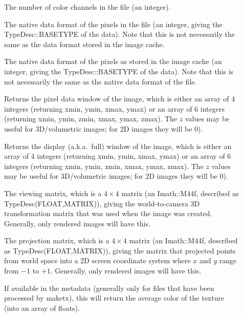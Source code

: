 \begin{description}
\item[\rm {}] The number of color channels in the file 
(an integer).

\item[\rm {}] The native data format of the pixels in the
  file (an integer, giving the {\cf TypeDesc::BASETYPE} of the data).
  Note that this is not necessarily the same as the data format stored
  in the image cache.

\item[\rm {}] The native data format of the pixels as
  stored in the image cache (an integer, giving the {\cf
    TypeDesc::BASETYPE} of the data).  Note that this is not necessarily
  the same as the native data format of the file.

\item[\rm {}] 
Returns the pixel data window of the image, which is either an array of 4
integers (returning xmin, ymin, xmax, ymax) or an array of 6 integers
(returning xmin, ymin, zmin, xmax, ymax, zmax). The $z$ values may be useful
for 3D/volumetric images; for 2D images they will be 0).

\item[\rm {}] 
Returns the display (a.k.a.\ full) window of the image, which is either an
array of 4 integers (returning xmin, ymin, xmax, ymax) or an array of 6
integers (returning xmin, ymin, zmin, xmax, ymax, zmax). The $z$ values may
be useful for 3D/volumetric images; for 2D images they will be 0).

\item[\rm {}] The viewing matrix, which is a $4 \times 4$
matrix (an {\cf Imath::M44f}, described as {\cf TypeDesc(FLOAT,MATRIX)}),
giving the world-to-camera 3D transformation matrix that was used when  the
image was created. Generally, only rendered images will have this.

\item[\rm {}] The projection matrix, which is a $4 \times 4$
matrix (an {\cf Imath::M44f}, described as {\cf TypeDesc(FLOAT,MATRIX)}),
giving the matrix that projected points from world space into a 2D screen
coordinate system where $x$ and $y$ range from $-1$ to $+1$.  Generally,
only rendered images will have this.

\item[\rm {}] If available in the metadata (generally only
for files that have been processed by {\cf maketx}), this will return the
average color of the texture (into an array of floats).


\end{description}
